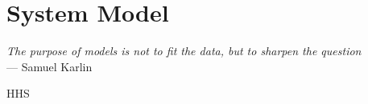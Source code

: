 \chapter{System Model}\label{ch:model} 

\begin{flushright}{\slshape
    The purpose of models is not to fit the data, but to sharpen the question} \\ \medskip
    --- Samuel Karlin
\end{flushright}
\ac{HHS}